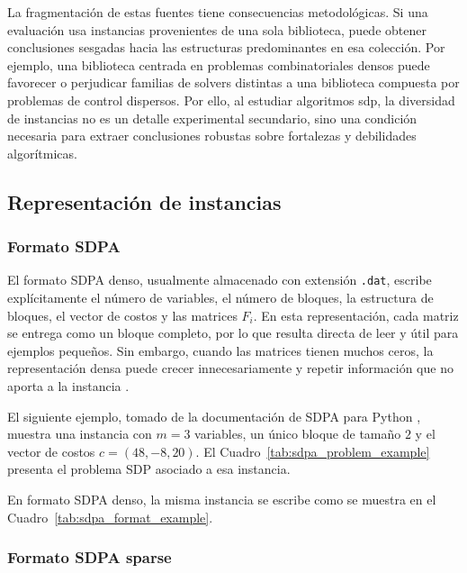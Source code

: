 La fragmentación de estas fuentes tiene consecuencias metodológicas. Si una evaluación usa
instancias provenientes de una sola biblioteca, puede obtener conclusiones sesgadas hacia las
estructuras predominantes en esa colección. Por ejemplo, una biblioteca centrada en problemas
combinatoriales densos puede favorecer o perjudicar familias de solvers distintas a una biblioteca
compuesta por problemas de control dispersos. Por ello, al estudiar algoritmos \acrshort{sdp}, la
diversidad de instancias no es un detalle experimental secundario, sino una condición necesaria
para extraer conclusiones robustas sobre fortalezas y debilidades algorítmicas.

\subsection{Representación de instancias}
\label{sec:representacion_instancias}

\subsubsection{Formato SDPA}
\label{subsec:formato_sdpa}

El formato SDPA denso, usualmente almacenado con extensión \texttt{.dat}, escribe explícitamente
el número de variables, el número de bloques, la estructura de bloques, el vector de costos y las
matrices $F_i$. En esta representación, cada matriz se entrega como un bloque completo, por lo
que resulta directa de leer y útil para ejemplos pequeños. Sin embargo, cuando las matrices tienen
muchos ceros, la representación densa puede crecer innecesariamente y repetir información que no
aporta a la instancia \cite{SDPAFormat}.

El siguiente ejemplo, tomado de la documentación de SDPA para Python \cite{SDPAFormat}, muestra una instancia
con $m=3$ variables, un único bloque de tamaño $2$ y el vector de costos
$c=(48,-8,20)$. El Cuadro~\ref{tab:sdpa_problem_example} presenta el problema SDP
asociado a esa instancia.



En formato SDPA denso, la misma instancia se escribe como se muestra en el
Cuadro~\ref{tab:sdpa_format_example}.



\newpage
\subsubsection{Formato SDPA sparse}
\label{subsec:formato_sdpa_sparse}

